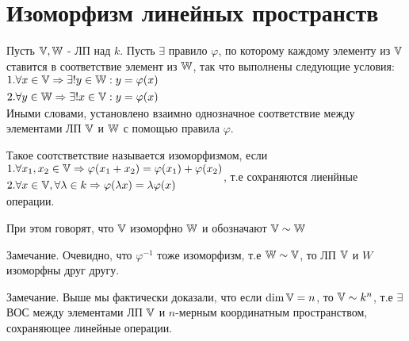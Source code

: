 \documentclass[../main.tex]{subfiles}
\begin{document}
\section{Изоморфизм линейных пространств}
Пусть $\mathbb{V}, \mathbb{W} $ - ЛП над $k$. Пусть $\exists $ правило $\varphi$, по которому каждому элементу из $\mathbb{V}$ ставится в соответствие элемент из $\mathbb{W}$, так что выполнены следующие условия:
$\begin{aligned}
    &1. \forall x \in \mathbb{V} \Rightarrow \exists ! y \in \mathbb{W}: y = \varphi(x)\\
    &2. \forall y \in \mathbb{W} \Rightarrow \exists ! x \in \mathbb{V}: y = \varphi(x)
\end{aligned}$
\\Иными словами, установлено взаимно однозначное соответствие между элементами ЛП $\mathbb{V}$ и $\mathbb{W}$ с помощью правила $\varphi$.
\begin{definition}
    Такое соотстветствие называется изоморфизмом, если 
    $\begin{aligned}
        &1. \forall x_{1},x_{2} \in \mathbb{V} \Rightarrow \varphi(x_{1}+x_{2}) = \varphi(x_{1})+\varphi(x_{2})\\ 
        &2. \forall x\in \mathbb{V}, \forall \lambda \in k \Rightarrow \varphi(\lambda x) = \lambda \varphi(x)
    \end{aligned}$, т.е сохраняются лиенйные операции.
\end{definition}
При этом говорят, что $\mathbb{V}$ изоморфно $\mathbb{W}$ и обозначают $\mathbb{V} \sim \mathbb{W}$

Замечание. Очевидно, что $\varphi^{-1}$ тоже изоморфизм, т.е $\mathbb{W} \sim \mathbb{V}$, то ЛП $\mathbb{V}$ и $W$ изоморфны друг другу.

Замечание. Выше мы фактически доказали, что если $\dim \mathbb{V} = n $, то $\mathbb{V} \sim k^{n}$, т.е $\exists $ ВОС между элементами ЛП $\mathbb{V}$ и $n$-мерным координатным пространством, сохраняющее линейные операции. 
\end{document}
